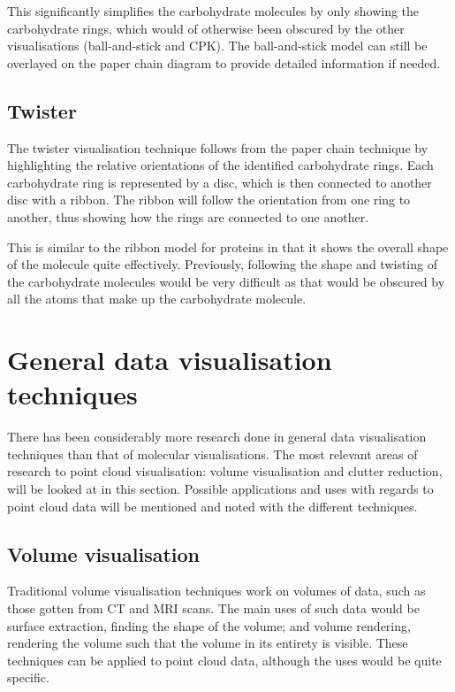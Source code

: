 \documentclass[a4paper]{article}
\begin{document}
This significantly simplifies the carbohydrate molecules by only showing the
carbohydrate rings, which would of otherwise been obscured by the other
visualisations (ball-and-stick and CPK). The ball-and-stick model can still be
overlayed on the paper chain diagram to provide detailed information if needed.

\subsection*{Twister}
The twister visualisation technique \citep{kuttel06} follows from the paper
chain technique by highlighting the relative orientations of the identified
carbohydrate rings. Each carbohydrate ring is represented by a disc, which is
then connected to another disc with a ribbon. The ribbon will follow the
orientation from one ring to another, thus showing how the rings are connected
to one another.

This is similar to the ribbon model for proteins in that it shows the overall
shape of the molecule quite effectively. Previously, following the shape and
twisting of the carbohydrate molecules would be very difficult as that would be
obscured by all the atoms that make up the carbohydrate molecule.


\section{General data visualisation techniques}

There has been considerably more research done in general data visualisation
techniques than that of molecular visualisations. The most relevant areas of
research to point cloud visualisation: volume visualisation and clutter
reduction, will be looked at in this section. Possible applications and uses
with regards to point cloud data will be mentioned and noted with the different
techniques.

\subsection*{Volume visualisation}
Traditional volume visualisation techniques work on volumes of data, such as
those gotten from CT and MRI scans. The main uses of such data would be surface
extraction, finding the shape of the volume; and volume rendering, rendering the
volume such that the volume in its entirety is visible. These techniques can be
applied to point cloud data, although the uses would be quite specific.
\end{document}
